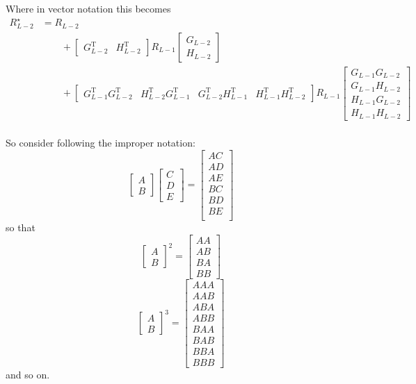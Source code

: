\documentclass{article}
\begin{document}
Where in vector notation this becomes
\begin{align*}
R^{\star}_{L-2} &= R_{L-2} \\
&\qquad + \begin{bmatrix}
G_{L-2}^{\text{T}} & H_{L-2}^{\text{T}}
\end{bmatrix}
R_{L-1}
\begin{bmatrix}
G_{L-2} \\
H_{L-2}
\end{bmatrix} \\
&\qquad + 
\begin{bmatrix}
G_{L-1}^{\text{T}} G_{L-2}^{\text{T}} & H_{L-2}^{\text{T}} G_{L-1}^{\text{T}} & G_{L-2}^{\text{T}} H_{L-1}^{\text{T}} & H_{L-1}^{\text{T}} H_{L-2}^{\text{T}}
\end{bmatrix}
R_{L-1}
\begin{bmatrix}
G_{L-1} G_{L-2} \\
G_{L-1} H_{L-2} \\
H_{L-1} G_{L-2} \\
H_{L-1} H_{L-2}
\end{bmatrix}
\end{align*}

\paragraph{}
So consider following the improper notation:
\[ \boxed{
\begin{bmatrix}
A \\
B
\end{bmatrix}
\begin{bmatrix}
C \\
D \\
E
\end{bmatrix}
=
\begin{bmatrix}
AC \\
AD \\
AE \\
BC \\
BD \\
BE \\
\end{bmatrix}
}
\]
so that
\[
\begin{bmatrix}
A \\
B
\end{bmatrix}^{2}
=
\begin{bmatrix}
AA \\
AB \\
BA \\
BB
\end{bmatrix}
\]
\[ 
\begin{bmatrix}
A \\
B
\end{bmatrix}^{3}
=
\begin{bmatrix}
AAA \\
AAB \\
ABA \\
ABB \\
BAA \\
BAB \\
BBA \\
BBB
\end{bmatrix}
\]
and so on.
\end{document}
